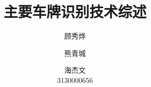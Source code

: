 \documentclass{article}
\title {主要车牌识别技术综述}
\author{
    顾秀烨\\
    \and
    熊青城\\
    \and
    海杰文\\
    3130000656
}
\begin{document}
\maketitle
\tableofcontents





\renewcommand\refname{参考文献}


\end{document}
